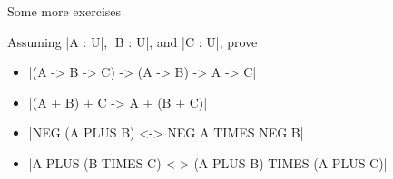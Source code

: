 \documentclass[t,compress,hyperref={hidelinks}]{beamer}
\begin{document}
\begin{frame}{Some more exercises}

Assuming |A : U|, |B : U|, and |C : U|, prove

\begin{itemize}

\item |(A -> B -> C) -> (A -> B) -> A -> C|

\item |(A + B) + C -> A + (B + C)|

\item |NEG (A PLUS B) <-> NEG A TIMES NEG B|

\item |A PLUS (B TIMES C) <-> (A PLUS B) TIMES (A PLUS C)|

\end{itemize}

\end{frame}
\end{document}
